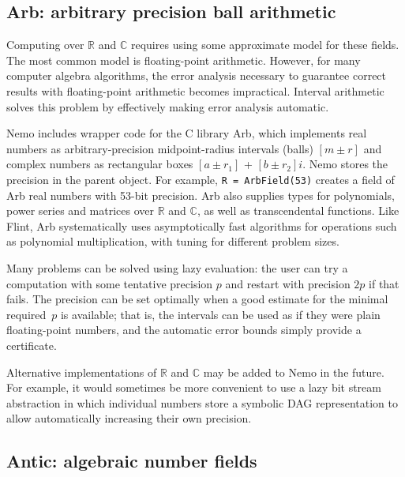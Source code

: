 \documentclass{sig-alternate-05-2015}
\begin{document}
\subsection{Arb: arbitrary precision ball arithmetic}

Computing over $\mathbb{R}$ and $\mathbb{C}$ requires
using some approximate model for these fields.
The most common model is floating-point arithmetic.
However, for many computer algebra algorithms,
the error analysis necessary to guarantee correct
results with floating-point arithmetic
becomes impractical.
Interval arithmetic solves this problem by effectively making
error analysis automatic.

Nemo includes wrapper code for the C library Arb, which implements real numbers as
arbitrary-precision midpoint-radius intervals (balls) $[m \pm r]$
and complex numbers as rectangular boxes $[a \pm r_1]$ + $[b \pm r_2] i$.
Nemo stores the precision in the parent object.
For example, \texttt{R = ArbField(53)}
creates a field of Arb real numbers with 53-bit precision.
Arb also supplies types for polynomials, power series and matrices
over $\mathbb{R}$ and $\mathbb{C}$, as well as transcendental functions.
Like Flint, Arb systematically uses asymptotically fast algorithms
for operations such as polynomial multiplication, with tuning
for different problem sizes.

Many problems can be solved using lazy evaluation: the user can
try a computation with some tentative precision $p$ and restart
with precision $2p$ if that fails. The precision can be set
optimally when a good estimate for the minimal
required~$p$ is available; that is, the intervals
can be used as if they were plain floating-point numbers, and the automatic
error bounds simply provide a certificate.

Alternative implementations of $\mathbb{R}$ and $\mathbb{C}$
may be added to Nemo in the future.
For example, it would sometimes be more convenient to use a lazy
bit stream abstraction in which individual numbers
store a symbolic DAG representation to allow automatically
increasing their own precision.


\subsection{Antic: algebraic number fields}
\end{document}
